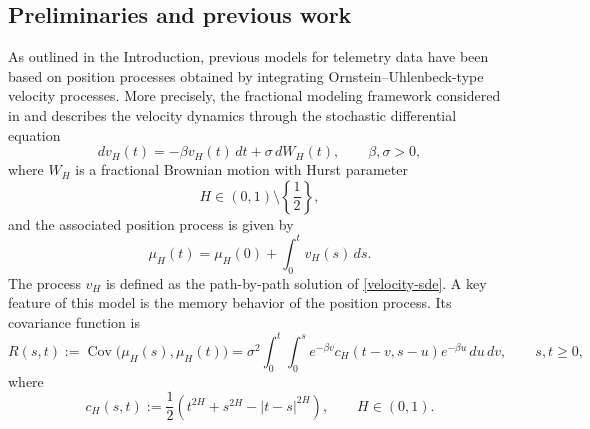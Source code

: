\documentclass[preprint,12pt,authoryear]{elsarticle}
\begin{document}





\subsection{Preliminaries and previous work}\label{Preliminaries}

As outlined in the Introduction, previous models for telemetry data
have been based on position processes obtained by integrating
Ornstein--Uhlenbeck-type velocity processes. More precisely, the
fractional modeling framework considered in \cite{RCMS24} and
\cite{JY} describes the velocity dynamics through the stochastic
differential equation
\begin{equation}\label{velocity-sde}
    dv_H(t)
    =
    -\beta v_H(t)\,dt
    +
    \sigma\,dW_H(t),
    \qquad
    \beta,\sigma>0,
\end{equation}
where $W_H$ is a fractional Brownian motion with Hurst parameter
\[
H\in(0,1)\setminus\left\{\frac12\right\},
\]
and the associated position process is given by
\begin{equation}\label{position-process}
    \mu_H(t)
    =
    \mu_H(0)
    +
    \int_0^t v_H(s)\,ds.
\end{equation}
The process $v_H$ is defined as the path-by-path solution of
\eqref{velocity-sde}. A key feature of this model is the memory
behavior of the position process. Its covariance function is
\begin{equation}\label{QMH}
    R(s,t)
    :=
    \operatorname{Cov}\bigl(\mu_H(s),\mu_H(t)\bigr)
    =
    \sigma^2
    \int_0^t
    \int_0^s
    e^{-\beta v}
    c_H(t-v,s-u)
    e^{-\beta u}
    \,du\,dv,
    \qquad
    s,t\geq0,
\end{equation}
where
\[
    c_H(s,t)
    :=
    \frac12
    \left(
        t^{2H}
        +
        s^{2H}
        -
        |t-s|^{2H}
    \right),
    \qquad
    H\in(0,1).
\]
\end{document}
